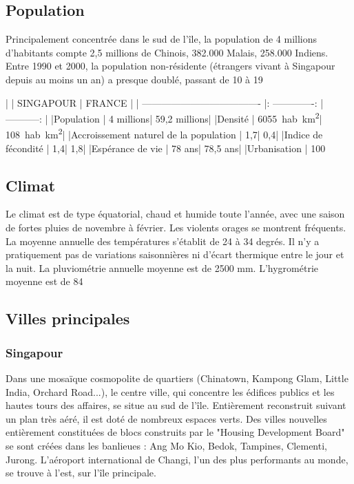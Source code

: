\begin{multicols}{2}
\subsection{Population}

Principalement concentrée dans le sud de l'île, la population de 4 millions d'habitants compte 2,5 millions de Chinois, 382.000 Malais, 258.000 Indiens. Entre 1990 et 2000, la population non-résidente (étrangers vivant à Singapour depuis au moins un an) a presque doublé, passant de 10 à 19%

|                                       |     SINGAPOUR   |    FRANCE    |
| ------------------------------------- |: -------------: | -----------: |
|Population                             |       4 millions| 59,2 millions|
|Densité                                |     \SI{6055}{hab.km^2}|   \SI{108}{hab.km^2}|
|Accroissement naturel de la population |              1,7|           0,4|
|Indice de fécondité                    |              1,4|           1,8|
|Espérance de vie                       |           78 ans|      78,5 ans|
|Urbanisation                           |            100 %

\subsection{Climat}

Le climat est de type équatorial, chaud et humide toute l'année, avec une saison de fortes pluies de novembre à février. Les violents orages se montrent fréquents. La moyenne annuelle des températures s'établit de 24 à 34 degrés. Il n'y a pratiquement pas de variations saisonnières ni d'écart thermique entre le jour et la nuit. La pluviométrie annuelle moyenne est de 2500 mm. L'hygrométrie moyenne est de 84%

\subsection{Villes principales}

\subsubsection{Singapour}
Dans une mosaïque cosmopolite de quartiers (Chinatown, Kampong Glam, Little India, Orchard Road...), le centre ville, qui concentre les édifices publics et les hautes tours des affaires, se situe au sud de l'île. Entièrement reconstruit suivant un plan très aéré, il est doté de nombreux espaces verts. Des villes nouvelles entièrement constituées de blocs construits par le "Housing Development Board" se sont créées dans les banlieues : Ang Mo Kio, Bedok, Tampines, Clementi, Jurong. L'aéroport international de Changi, l'un des plus performants au monde, se trouve à l'est, sur l'île principale.

\end{multicols}
